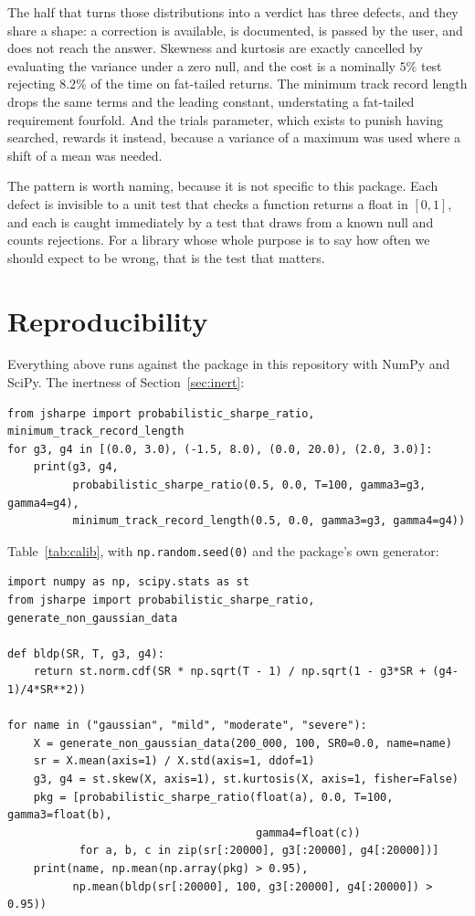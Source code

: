 \documentclass[11pt,a4paper]{article}
\newcommand{\code}[1]{\texttt{#1}}
\begin{document}
The half that turns those distributions into a verdict has three defects, and
they share a shape: a correction is available, is documented, is passed by the
user, and does not reach the answer. Skewness and kurtosis are exactly
cancelled by evaluating the variance under a zero null, and the cost is a
nominally $5\%$ test rejecting $8.2\%$ of the time on fat-tailed returns. The
minimum track record length drops the same terms and the leading constant,
understating a fat-tailed requirement fourfold. And the trials parameter, which
exists to punish having searched, rewards it instead, because a variance of a
maximum was used where a shift of a mean was needed.

The pattern is worth naming, because it is not specific to this package. Each
defect is invisible to a unit test that checks a function returns a float in
$[0, 1]$, and each is caught immediately by a test that draws from a known null
and counts rejections. For a library whose whole purpose is to say how often we
should expect to be wrong, that is the test that matters.

\appendix

\section{Reproducibility}
\label{app:repro}

Everything above runs against the package in this repository with NumPy and
SciPy. The inertness of Section~\ref{sec:inert}:

\begin{verbatim}
from jsharpe import probabilistic_sharpe_ratio, minimum_track_record_length
for g3, g4 in [(0.0, 3.0), (-1.5, 8.0), (0.0, 20.0), (2.0, 3.0)]:
    print(g3, g4,
          probabilistic_sharpe_ratio(0.5, 0.0, T=100, gamma3=g3, gamma4=g4),
          minimum_track_record_length(0.5, 0.0, gamma3=g3, gamma4=g4))
\end{verbatim}

Table~\ref{tab:calib}, with \code{np.random.seed(0)} and the package's own
generator:

\begin{verbatim}
import numpy as np, scipy.stats as st
from jsharpe import probabilistic_sharpe_ratio, generate_non_gaussian_data

def bldp(SR, T, g3, g4):
    return st.norm.cdf(SR * np.sqrt(T - 1) / np.sqrt(1 - g3*SR + (g4-1)/4*SR**2))

for name in ("gaussian", "mild", "moderate", "severe"):
    X = generate_non_gaussian_data(200_000, 100, SR0=0.0, name=name)
    sr = X.mean(axis=1) / X.std(axis=1, ddof=1)
    g3, g4 = st.skew(X, axis=1), st.kurtosis(X, axis=1, fisher=False)
    pkg = [probabilistic_sharpe_ratio(float(a), 0.0, T=100, gamma3=float(b),
                                      gamma4=float(c))
           for a, b, c in zip(sr[:20000], g3[:20000], g4[:20000])]
    print(name, np.mean(np.array(pkg) > 0.95),
          np.mean(bldp(sr[:20000], 100, g3[:20000], g4[:20000]) > 0.95))
\end{verbatim}
\end{document}
